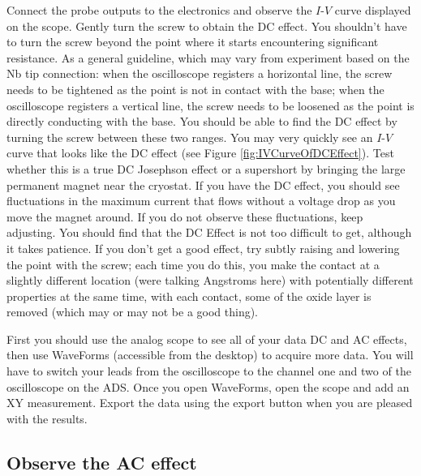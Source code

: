 \documentclass{../lab}
\begin{document}
Connect the probe outputs to the electronics and observe the $I$-$V$ curve displayed on the scope. Gently turn the screw to obtain the DC effect. You shouldn't have to turn the screw beyond the point where it starts encountering significant resistance. As a general guideline, which may vary from experiment based on the Nb tip connection: when the oscilloscope registers a horizontal line, the screw needs to be tightened as the point is not in contact with the base; when the oscilloscope registers a vertical line, the screw needs to be loosened as the point is directly conducting with the base. You should be able to find the DC effect by turning the screw between these two ranges. You may very quickly see an $I$-$V$ curve that looks like the DC effect (see Figure \ref{fig:IVCurveOfDCEffect}). Test whether this is a true DC Josephson effect or a supershort by bringing the large permanent magnet near the cryostat. If you have the DC effect, you should see fluctuations in the maximum current that flows without a voltage drop as you move the magnet around. If you do not observe these fluctuations, keep adjusting. You should find that the DC Effect is not too difficult to get, although it takes patience. If you don't get a good effect, try subtly raising and lowering the point with the screw; each time you do this, you make the contact at a slightly different location (were talking Angstroms here) with potentially different properties at the same time, with each contact, some of the oxide layer is removed (which may or may not be a good thing).

First you should use the analog scope to see all of your data DC and AC effects, then use WaveForms (accessible from the desktop) to acquire more data. You will have to switch your leads from the oscilloscope to the channel one and two of the oscilloscope on the ADS. Once you open WaveForms, open the scope and add an XY measurement. Export the data using the export button when you are pleased with the results.



\subsection{Observe the AC effect}
\end{document}
